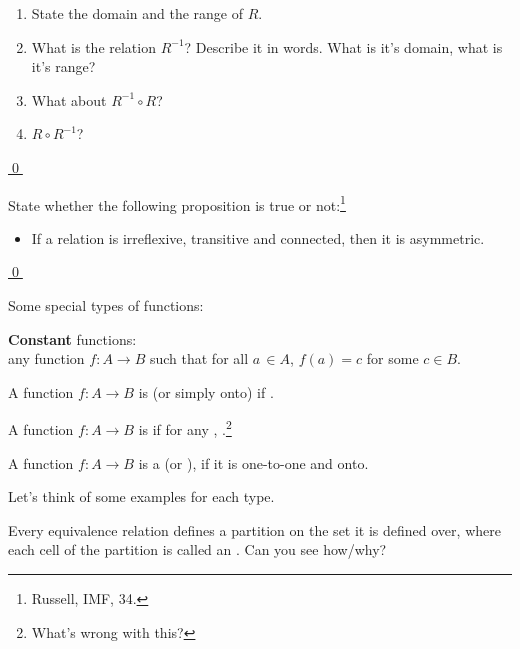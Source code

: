 \documentclass[11pt]{article}
\begin{document}
{\begin{uexercise}
\begin{enumerate}
\item\label{exhumansa} State the domain and  the range of $R$. 
\item\label{exhumansb}
What is the relation $R^{-1}$? Describe it in words. What is it's domain, what
is it's range?
\item\label{exhumansc}  What about $R^{-1} \circ R$?
\item\label{exhumansd} $R\circ R^{-1} $?
\end{enumerate}

\hyperlink{exhumanssol}{\qed}
\end{uexercise}

\begin{uexercise}\label{exrussell}
State whether the following proposition is true or
not:\footnote{Russell, IMF, 34.}
\begin{itemize}
\item[] If a relation is irreflexive, transitive and connected, then it is
asymmetric.
\end{itemize}
\hyperlink{exrussellsol}{\qed}
\end{uexercise}


\hrulefill

\item Some special types of functions:

\item[] {\bf Constant} functions:\\
any function $f:A\rightarrow B$ such that for all $a\, \in A$, $f(a) = c$ for
some $c\in B$.

\item[] A function $f:A\rightarrow B$ is   (or simply onto)
if .

\item[] A function $f:A\rightarrow B$ is  if for any
, .\footnote{What's wrong with
this?}

\item[]A function $f:A\rightarrow B$ is a  (or
), if it is one-to-one and onto.


\item Let's think of some examples for each type.

\begin{uexercise}[*]\label{ex-equi}
Every equivalence relation defines a partition on the set it is
defined over, where each cell of the partition is called an . Can you see how/why?
\end{uexercise}
}
\end{document}
